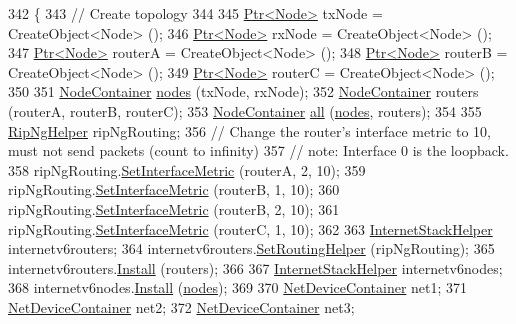 \begin{DoxyCode}
342 \{
343   \textcolor{comment}{// Create topology}
344 
345   \hyperlink{classns3_1_1Ptr}{Ptr<Node>} txNode = CreateObject<Node> ();
346   \hyperlink{classns3_1_1Ptr}{Ptr<Node>} rxNode = CreateObject<Node> ();
347   \hyperlink{classns3_1_1Ptr}{Ptr<Node>} routerA = CreateObject<Node> ();
348   \hyperlink{classns3_1_1Ptr}{Ptr<Node>} routerB = CreateObject<Node> ();
349   \hyperlink{classns3_1_1Ptr}{Ptr<Node>} routerC = CreateObject<Node> ();
350 
351   \hyperlink{classns3_1_1NodeContainer}{NodeContainer} \hyperlink{visualizer-ideas_8txt_a3e1b3808014a2c68ab0cd0182e041be2}{nodes} (txNode, rxNode);
352   \hyperlink{classns3_1_1NodeContainer}{NodeContainer} routers (routerA, routerB, routerC);
353   \hyperlink{classns3_1_1NodeContainer}{NodeContainer} \hyperlink{buildings__pathloss_8m_a00a349297fa58bc80ff5329e25dcfe28}{all} (\hyperlink{visualizer-ideas_8txt_a3e1b3808014a2c68ab0cd0182e041be2}{nodes}, routers);
354 
355   \hyperlink{classns3_1_1RipNgHelper}{RipNgHelper} ripNgRouting;
356   \textcolor{comment}{// Change the router's interface metric to 10, must not send packets (count to infinity)}
357   \textcolor{comment}{// note: Interface 0 is the loopback.}
358   ripNgRouting.\hyperlink{classns3_1_1RipNgHelper_a6df4de50669cbe91d0a65746c1fade36}{SetInterfaceMetric} (routerA, 2, 10);
359   ripNgRouting.\hyperlink{classns3_1_1RipNgHelper_a6df4de50669cbe91d0a65746c1fade36}{SetInterfaceMetric} (routerB, 1, 10);
360   ripNgRouting.\hyperlink{classns3_1_1RipNgHelper_a6df4de50669cbe91d0a65746c1fade36}{SetInterfaceMetric} (routerB, 2, 10);
361   ripNgRouting.\hyperlink{classns3_1_1RipNgHelper_a6df4de50669cbe91d0a65746c1fade36}{SetInterfaceMetric} (routerC, 1, 10);
362 
363   \hyperlink{classns3_1_1InternetStackHelper}{InternetStackHelper} internetv6routers;
364   internetv6routers.\hyperlink{classns3_1_1InternetStackHelper_a3e382c02df022dec79952a7eca8cd5ba}{SetRoutingHelper} (ripNgRouting);
365   internetv6routers.\hyperlink{classns3_1_1InternetStackHelper_a6645b412f31283d2d9bc3d8a95cebbc0}{Install} (routers);
366 
367   \hyperlink{classns3_1_1InternetStackHelper}{InternetStackHelper} internetv6nodes;
368   internetv6nodes.\hyperlink{classns3_1_1InternetStackHelper_a6645b412f31283d2d9bc3d8a95cebbc0}{Install} (\hyperlink{visualizer-ideas_8txt_a3e1b3808014a2c68ab0cd0182e041be2}{nodes});
369 
370   \hyperlink{classns3_1_1NetDeviceContainer}{NetDeviceContainer} net1;
371   \hyperlink{classns3_1_1NetDeviceContainer}{NetDeviceContainer} net2;
372   \hyperlink{classns3_1_1NetDeviceContainer}{NetDeviceContainer} net3;

\end{DoxyCode}
